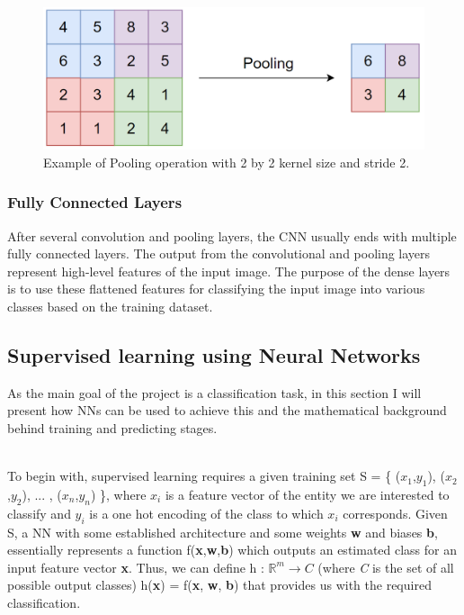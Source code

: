 \begin{figure}[H]
  \centering
  \includegraphics[scale=0.3]{Images/pooling.png}
  \caption{Example of Pooling operation with 2 by 2 kernel size and stride 2.}
  \label{Pooling}
\end{figure}

\subsubsection*{Fully Connected Layers}

After several convolution and pooling layers, the CNN usually ends with multiple fully connected layers. The output from the convolutional and pooling layers represent high-level features of the input image. The purpose of the dense layers is to use these flattened features for classifying the input image into various classes based on the training dataset. \\

\subsection{Supervised learning using Neural Networks}

As the main goal of the project is a classification task, in this section I will present how NNs can be used to achieve this and the mathematical background behind training and predicting stages. \\\

To begin with, supervised learning requires a given training set S = \{ ($x_1$,$y_1$), ($x_2$,$y_2$), ... , ($x_n$,$y_n$) \}, where \textbf{$x_i$} is a feature vector of the entity we are interested to classify and \textbf{$y_i$} is a one hot encoding of the class to which \textbf{$x_i$} corresponds. Given S, a NN with some established architecture and some weights \textbf{w} and biases \textbf{b}, essentially represents a function f(\textbf{x},\textbf{w},\textbf{b}) which outputs an estimated class for an input feature vector \textbf{x}. Thus, we can define h : $\mathbb{R}^m \rightarrow \textit{C}$ (where \textit{C} is the set of all possible output classes) h(\textbf{x}) = f(\textbf{x}, \textbf{w}, \textbf{b}) that provides us with the required classification.

